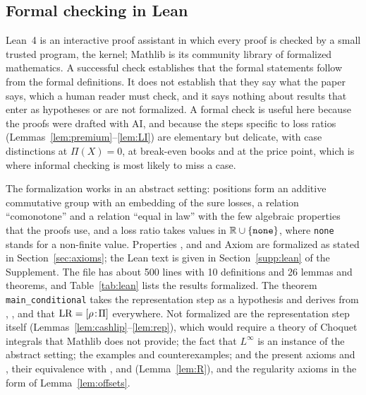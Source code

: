 \subsection{Formal checking in Lean}\label{sec:collab-lean}

Lean~4 \citep{demoura2021} is an interactive proof assistant in which every proof is checked by a small trusted
program, the kernel; Mathlib \citep{mathlib2020} is its community library of formalized mathematics. A successful
check establishes that the formal statements follow from the formal definitions. It does not establish that they say
what the paper says, which a human reader must check, and it says nothing about results that enter as hypotheses or
are not formalized. A formal check is useful here because the proofs were drafted with AI, and because the steps
specific to loss ratios (Lemmas~\ref{lem:premium}--\ref{lem:LI}) are elementary but delicate, with case distinctions
at $\Pi(X)=0$, at break-even books and at the price point, which is where informal checking is most likely to miss a
case.

The formalization works in an abstract setting: positions form an additive commutative group with an embedding of
the sure losses, a relation ``comonotone'' and a relation ``equal in law'' with the few algebraic properties that the
proofs use, and a loss ratio takes values in $\mathbb R\cup\{\mathtt{none}\}$, where \texttt{none} stands for a non-finite
value. Properties \axP, \axN{} and \axCM{} and Axiom \axLI{} are formalized as stated in Section~\ref{sec:axioms}; the
Lean text is given in Section~\ref{supp:lean} of the Supplement. The file has about 500 lines with 10 definitions and
26 lemmas and theorems, and Table~\ref{tab:lean} lists the results formalized. The theorem \texttt{main\_conditional}
takes the representation step \citep[Thm.~1]{www2020} as a hypothesis and derives from \axP, \axN, \axCM{} and \axLI{}
that $\mathrm{LR}=[\rho\!:\!\Pi]$ everywhere. Not formalized are the representation step itself
(Lemmas~\ref{lem:cashlip}--\ref{lem:rep}), which would require a theory of Choquet integrals that Mathlib does not
provide; the fact that $L^\infty$ is an instance of the abstract setting; the examples and counterexamples; and the
present axioms \axPe{} and \axR, their equivalence with \axP, \axN{} and \axCM{} (Lemma~\ref{lem:R}), and the
regularity axioms in the form of Lemma~\ref{lem:offsets}.

